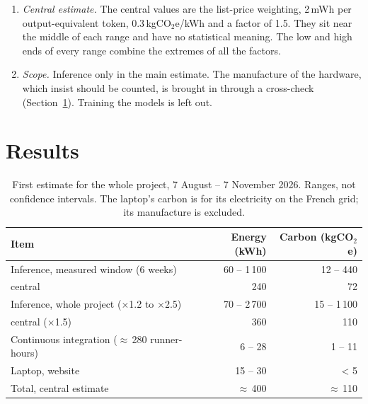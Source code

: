 \documentclass[11pt,a4paper]{article}
\newcommand{\COe}{\,kgCO$_2$e}
\begin{document}
\begin{enumerate}
\item \emph{Central estimate.} The central values are the list-price weighting, 2\,mWh per output-equivalent token, 0.3\COe/kWh and a factor of 1.5. They sit near the middle of each range and have no statistical meaning. The low and high ends of every range combine the extremes of all the factors.
\item \emph{Scope.} Inference only in the main estimate. The manufacture of the hardware, which \citet{ligozat2022} insist should be counted, is brought in through a cross-check (Section~\ref{sec:results}). Training the models is left out.
\end{enumerate}

\section{Results}\label{sec:results}

\begin{table}[h]\centering
\begin{tabular}{lrr}
\toprule
Item & Energy (kWh) & Carbon (kgCO$_2$e)\\
\midrule
Inference, measured window (6 weeks) & 60 -- 1\,100 & 12 -- 440\\
\quad central & 240 & 72\\
Inference, whole project ($\times$1.2 to $\times$2.5) & 70 -- 2\,700 & 15 -- 1\,100\\
\quad central ($\times$1.5) & 360 & 110\\
Continuous integration ($\approx$\,280 runner-hours) & 6 -- 28 & 1 -- 11\\
Laptop, website & 15 -- 30 & < 5\\
\midrule
Total, central estimate & $\approx$\,400 & $\approx$\,110\\
\bottomrule
\end{tabular}
\caption{First estimate for the whole project, 7 August -- 7 November 2026. Ranges, not confidence intervals. The laptop's carbon is for its electricity on the French grid; its manufacture is excluded.}\label{tab:results}
\end{table}
\end{document}
